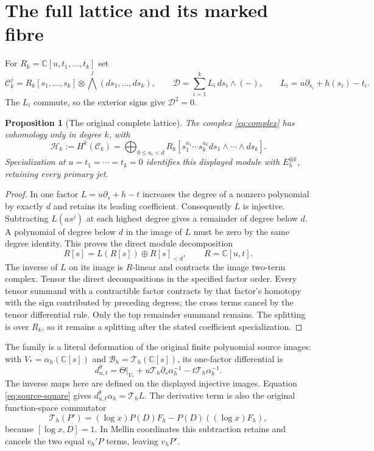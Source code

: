 \documentclass[11pt]{article}
\newtheorem{proposition}[theorem]{Proposition}
\newcommand{\C}{\mathbb C}
\newcommand{\HH}{\mathcal H}
\newcommand{\BB}{\mathscr B}
\begin{document}
\section{The full lattice and its marked fibre}

For $R_k=\C[u,t_1,\ldots,t_k]$ set
\begin{equation}
 \mathcal C_k^j=R_k[s_1,\ldots,s_k]\otimes
                  \bigwedge^j(ds_1,\ldots,ds_k),\qquad
 \mathcal D=\sum_{i=1}^k L_i\,ds_i\wedge(-),\qquad
 L_i=u\partial_{s_i}+h(s_i)-t_i.
 \label{eq:complex}
\end{equation}
The $L_i$ commute, so the exterior signs give $\mathcal D^2=0$.

\begin{proposition}[The original complete lattice]
The complex \eqref{eq:complex} has cohomology only in degree $k$, with
\begin{equation}
 \HH_k:=H^k(\mathcal C_k)
   =\bigoplus_{0\le a_i<d}R_k
       [s_1^{a_1}\cdots s_k^{a_k}ds_1\wedge\cdots\wedge ds_k].
 \label{eq:lattice}
\end{equation}
Specialization at $u=t_1=\cdots=t_k=0$ identifies this displayed
module with $E_h^{\otimes k}$, retaining every primary jet.
\end{proposition}
\begin{proof}
In one factor $L=u\partial_s+h-t$ increases the degree of a nonzero
polynomial by exactly $d$ and retains its leading coefficient.
Consequently $L$ is injective.  Subtracting $L(as^j)$ at each highest
degree gives a remainder of degree below $d$.  A polynomial of degree
below $d$ in the image of $L$ must be zero by the same degree identity.
This proves the direct module decomposition
\[
 R[s]=L(R[s])\oplus R[s]_{<d},\qquad R=\C[u,t].
\]
The inverse of $L$ on its image is $R$-linear and contracts the image
two-term complex.  Tensor the direct decompositions in the specified
factor order.  Every tensor summand with a contractible factor contracts
by that factor's homotopy with the sign contributed by preceding degrees;
the cross terms cancel by the tensor differential rule.  Only the top
remainder summand remains.  The splitting is over $R_k$, so it remains a
splitting after the stated coefficient specialization.
\end{proof}

The family is a literal deformation of the original finite polynomial
source images: with $V_* =\alpha_h(\C[s])$ and
$\BB_h=\mathcal T_h(\C[s])$, its one-factor differential is
\begin{equation}
 d^\theta_{u,t}=\Theta|_{V_*}
       +u\mathcal T_h\partial_s\alpha_h^{-1}
       -t\mathcal T_h\alpha_h^{-1}.
\end{equation}
The inverse maps here are defined on the displayed injective images.
Equation \eqref{eq:source-square} gives
$d^\theta_{u,t}\alpha_h=\mathcal T_hL$.
The derivative term is also the original function-space commutator
\[
 \mathcal T_h(P')=(\log x)P(D)F_h-P(D)((\log x)F_h),
\]
because $[\log x,D]=1$.  In Mellin coordinates this subtraction
retains and cancels the two equal $v_h'P$ terms, leaving $v_hP'$.
\end{document}
